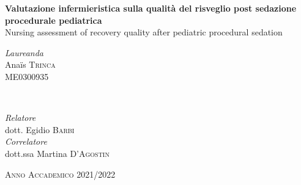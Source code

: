 \begin{titlepage}
\begin{center}
	
	\vfill
	
	{\huge\bfseries Valutazione infermieristica sulla qualità del risveglio post sedazione procedurale pediatrica}\\ [0.2cm] %
	
	{\huge Nursing assessment of recovery quality after pediatric procedural sedation}\\ [0.2cm] %
	
	\vfill\vfill
	
	
	\begin{minipage}{0.4\textwidth}
		\begin{flushleft}
			\large
			\textit{Laureanda}\\
			Ana\"is \textsc{Trinca}\\ %
			\small{ME0300935}
		\end{flushleft}
	\end{minipage}
	~
	\begin{minipage}{0.4\textwidth}
		\begin{flushright}
			\large
			\textit{Relatore}\\
			dott. Egidio \textsc{Barbi} \\ %
			\bigskip
			\textit{Correlatore}\\ 
			dott.ssa Martina \textsc{D'Agostin} \\ %
		\end{flushright}
	\end{minipage}
	
	
	\vfill\vfill
	
	{\large \textsc{Anno Accademico 2021/2022}}
	
	\vfill
	\end{center}
\end{titlepage}

